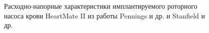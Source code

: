 \begin{figure}[ht]
  \begin{minipage}[ht]{0.48\linewidth}
  \end{minipage}
  \hfill
  \begin{minipage}[ht]{0.48\linewidth}
  \end{minipage}
  \caption{Расходно-напорные характеристики имплантируемого роторного насоса крови HeartMate II из работы Pennings и др. \cite{Pennings_2013} и Stanfield и др. \cite{Stanfield_2012}}
  \label{img:initial_data}  
\end{figure}

